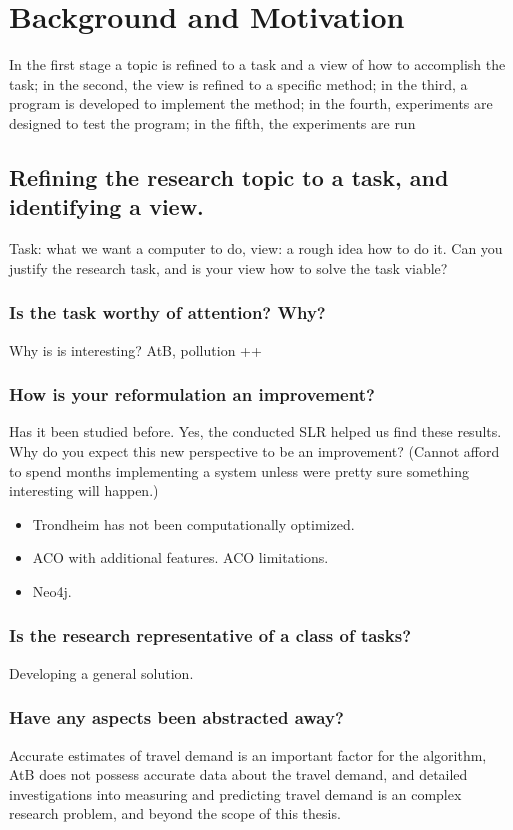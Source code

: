 \section{Background and Motivation}


In the first stage a topic is refined to a task and a view of how to accomplish the task; in the second, the view is refined to a specific method; in the third, a program is developed to implement the method; in the fourth, experiments are designed to test the program; in the fifth, the experiments are run\citep{cohen88}

\subsection{Refining the research topic to a task, and identifying a view.}
Task: what we want a computer to do, view: a rough idea how to do it. Can you justify the research task, and is your view how to solve the task viable? 

\subsubsection{Is the task worthy of attention? Why?}
Why is is interesting? AtB, pollution ++ 

\subsubsection{How is your reformulation an improvement?}
Has it been studied before. Yes, the conducted SLR helped us find these results.
Why do you expect this new perspective to be an improvement? (Cannot afford to spend months implementing a system unless were pretty sure something interesting will happen.)
\begin{itemize}
\item Trondheim has not been computationally optimized.
\item ACO with additional features. ACO limitations.
\item Neo4j.
\end{itemize}

\subsubsection{Is the research representative of a class of tasks?}
Developing a general solution.

\subsubsection{Have any aspects been abstracted away?}
Accurate estimates of travel demand is an important factor for the algorithm, AtB does not possess accurate data about the travel demand, and detailed investigations into measuring and predicting travel demand is an complex research problem, and beyond the scope of this thesis. 

